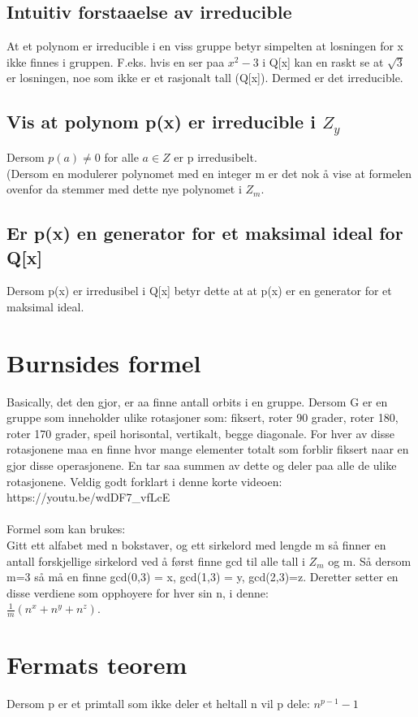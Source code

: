 \documentclass[12pt,a4paper]{article}
\begin{document}
\subsection*{Intuitiv forstaaelse av irreducible}
At et polynom er irreducible i en viss gruppe betyr simpelten at losningen for x ikke finnes i gruppen. F.eks. hvis en ser paa $x^2 - 3$ i Q[x] kan en raskt se at $\sqrt{3}$ er losningen, noe som ikke er et rasjonalt tall (Q[x]). Dermed er det irreducible. 

\subsection*{Vis at polynom p(x) er irreducible i $Z_y$}
Dersom $p(a) \neq 0$ for alle $a \in Z$ er p irredusibelt. \\
(Dersom en modulerer polynomet med en integer m er det nok å vise at formelen ovenfor da stemmer med dette nye polynomet i $Z_m$.


\subsection*{Er p(x) en generator for et maksimal ideal for Q[x]}
Dersom p(x) er irredusibel i Q[x] betyr dette at at p(x) er en generator for et maksimal ideal. 


\section*{Burnsides formel}
Basically, det den gjor, er aa finne antall orbits i en gruppe.
Dersom G er en gruppe som inneholder ulike rotasjoner som: fiksert, roter 90 grader, roter 180, roter 170 grader, speil horisontal, vertikalt, begge diagonale. For hver av disse rotasjonene maa en finne hvor mange elementer totalt som forblir fiksert naar en gjor disse operasjonene. En tar saa summen av dette og deler paa alle de ulike rotasjonene. Veldig godt forklart i denne korte videoen:\\
https://youtu.be/wdDF7\_vfLcE\\\\
Formel som kan brukes:\\
Gitt ett alfabet med n bokstaver, og ett sirkelord med lengde m så finner en antall forskjellige sirkelord ved å først finne gcd til alle tall i $Z_m$ og m. Så dersom m=3 så må en finne gcd(0,3) = x, gcd(1,3) = y, gcd(2,3)=z. Deretter setter en disse verdiene som opphoyere for hver sin n, i denne:\\
$\frac{1}{m}(n^x + n^y + n^z)$. 

\section*{Fermats teorem}
Dersom p er et primtall som ikke deler et heltall n vil p dele: $n^{p-1} - 1$
\end{document}
